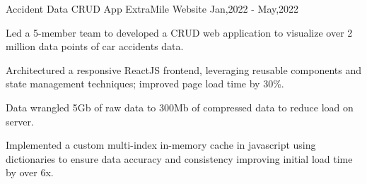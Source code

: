 \cventry
{Accident Data CRUD App} %
{ExtraMile Website \href{https://github.com/giathuan123/extramile}{\faExternalLink*}} %
{\diExpressOriginal \diReactPlainWordmark \diNodejsPlain \diPythonPlain } %
{Jan,2022 - May,2022} %
{
	\begin{cvitems} %
  \item {Led a 5-member team to developed a CRUD web application to visualize over 2 million data points of car accidents data.}
  \item {Architectured a responsive ReactJS frontend, leveraging reusable components and state management techniques; improved page load time by 30\%.}
  \item {Data wrangled 5Gb of raw data to 300Mb of compressed data to reduce load on server.}
  \item {Implemented a custom multi-index in-memory cache in javascript using dictionaries to ensure data accuracy and consistency improving initial load time by over 6x.}
	\end{cvitems}
}

